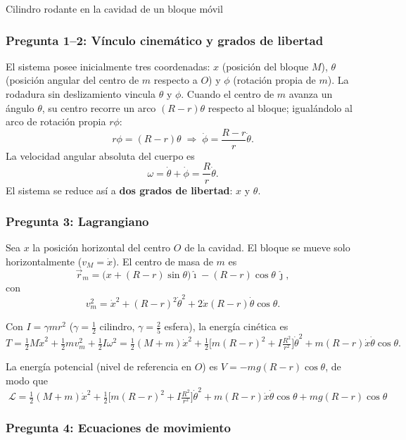 \begin{solucion}{Cilindro rodante en la cavidad de un bloque móvil}
\subsubsection*{Pregunta 1--2: Vínculo cinemático y grados de libertad}

El sistema posee inicialmente tres coordenadas: $x$ (posición del bloque $M$), $\theta$
(posición angular del centro de $m$ respecto a $O$) y $\phi$ (rotación propia de $m$). La
rodadura sin deslizamiento vincula $\theta$ y $\phi$. Cuando el centro de $m$ avanza un
ángulo $\theta$, su centro recorre un arco $(R-r)\theta$ respecto al bloque; igualándolo al
arco de rotación propia $r\phi$:
$$r\phi = (R-r)\theta \;\Longrightarrow\; \dot\phi = \frac{R-r}{r}\dot\theta.$$
La velocidad angular absoluta del cuerpo es
$$\omega = \dot\theta + \dot\phi = \frac{R}{r}\dot\theta.$$
El sistema se reduce así a \textbf{dos grados de libertad}: $x$ y $\theta$.

\subsubsection*{Pregunta 3: Lagrangiano}

Sea $x$ la posición horizontal del centro $O$ de la cavidad. El bloque se mueve solo
horizontalmente ($v_M=\dot x$). El centro de masa de $m$ es
$$\vec{r}_m = \big(x + (R-r)\sin\theta\big)\hat{\imath} - (R-r)\cos\theta\,\hat{\jmath},$$
con
$$v_m^2 = \dot{x}^2 + (R-r)^2\dot\theta^2 + 2\dot{x}(R-r)\dot\theta\cos\theta.$$

Con $I=\gamma m r^2$ ($\gamma=\tfrac12$ cilindro, $\gamma=\tfrac25$ esfera), la energía
cinética es
$$T = \tfrac12 M\dot{x}^2 + \tfrac12 m v_m^2 + \tfrac12 I\omega^2
= \tfrac12(M+m)\dot{x}^2
+ \tfrac12\Big[m(R-r)^2 + I\tfrac{R^2}{r^2}\Big]\dot\theta^2
+ m(R-r)\dot{x}\dot\theta\cos\theta.$$

La energía potencial (nivel de referencia en $O$) es $V=-mg(R-r)\cos\theta$, de modo que
$$\boxed{\;\mathcal{L} = \tfrac12(M+m)\dot{x}^2
+ \tfrac12\Big[m(R-r)^2 + I\tfrac{R^2}{r^2}\Big]\dot\theta^2
+ m(R-r)\dot{x}\dot\theta\cos\theta + mg(R-r)\cos\theta\;}$$

\subsubsection*{Pregunta 4: Ecuaciones de movimiento}


\end{solucion}
